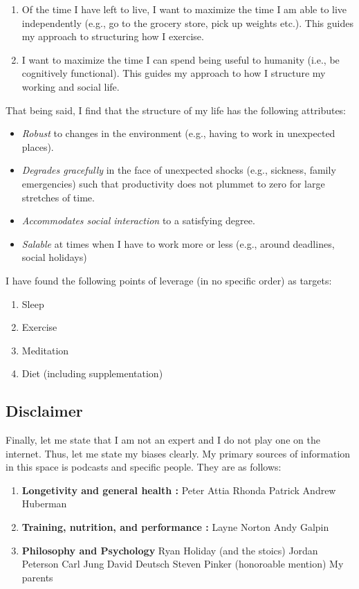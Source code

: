 \documentclass[10pt,twocolumn]{extarticle}
\begin{document}
\begin{enumerate}
    \item Of the time I have left to live, I want to maximize the time I am able to live independently (e.g., go to the grocery store, pick up weights etc.).
    \subitem This guides my approach to structuring how I exercise.
    \item I want to maximize the time I can spend being useful to humanity (i.e., be cognitively functional).
    \subitem This guides my approach to how I structure my working and social life.
\end{enumerate}

That being said, I find that the structure of my life has the following attributes:

\begin{itemize}
    \item \textit{Robust} to changes in the environment (e.g., having to work in unexpected places).
    \item \textit{Degrades gracefully} in the face of unexpected shocks (e.g., sickness, family emergencies) such that productivity does not plummet to zero for large stretches of time.
    \item \textit{Accommodates social interaction} to a satisfying degree.
    \item \textit{Salable} at times when I have to work more or less (e.g., around deadlines, social holidays)
\end{itemize}


I have found the following points of leverage (in no specific order) as targets:
\begin{enumerate}
    \item Sleep
    \item Exercise
    \item Meditation
    \item Diet (including supplementation)
\end{enumerate}

\subsection{Disclaimer} 

Finally, let me state that I am not an expert and I do not play one on the internet. Thus, let me state my biases clearly. My primary sources of information in this space is podcasts and specific people. They are as follows: 

\begin{enumerate}
    \item \textbf{Longetivity and general health :}
    \subitem Peter Attia
    \subitem Rhonda Patrick 
    \subitem Andrew Huberman 
    \item \textbf{Training, nutrition, and performance :}
    \subitem Layne Norton
    \subitem Andy Galpin 
    \item \textbf{Philosophy and Psychology}
    \subitem Ryan Holiday (and the stoics)
    \subitem Jordan Peterson
    \subitem Carl Jung
    \subitem David Deutsch
    \subitem Steven Pinker
    \subitem (honoroable mention) My parents 
\end{enumerate}
\end{document}
